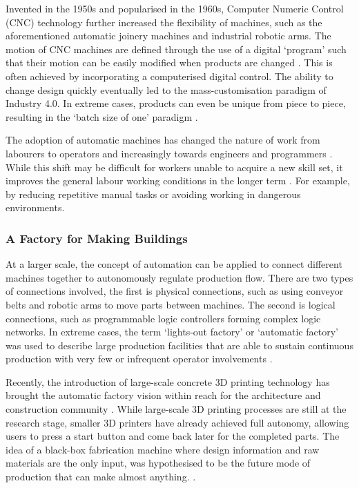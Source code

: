 Invented in the 1950s and popularised in the 1960s, Computer Numeric Control (CNC) technology further increased the flexibility of machines, such as the aforementioned automatic joinery machines and industrial robotic arms. The motion of CNC machines are defined through the use of a digital ‘program’ such that their motion can be easily modified when products are changed \parencite{wardAutomaticProgrammingNumerically1959}. This is often achieved by incorporating a computerised digital control. The ability to change design quickly eventually led to the mass-customisation paradigm of Industry 4.0. In extreme cases, products can even be unique from piece to piece, resulting in the ‘batch size of one’ paradigm \parencite{wardAutomaticProgrammingNumerically1959}.

The adoption of automatic machines has changed the nature of work from labourers to operators and increasingly towards engineers and programmers \parencite{nobleForcesProductionSocial1986}. While this shift may be difficult for workers unable to acquire a new skill set, it improves the general labour working conditions in the longer term \parencite{stromquistWorldDevelopmentReport2019}. For example, by reducing repetitive manual tasks or avoiding working in dangerous environments. 

\subsubsection{A Factory for Making Buildings}
\label{subsubsection:introduction_a_factory_for_making_buildings}

At a larger scale, the concept of automation can be applied to connect different machines together to autonomously regulate production flow. There are two types of connections involved, the first is physical connections, such as using conveyor belts and robotic arms to move parts between machines. The second is logical connections, such as programmable logic controllers forming complex logic networks. In extreme cases, the term ‘lights-out factory’ or ‘automatic factory’ was used to describe large production facilities that are able to sustain continuous production with very few or infrequent operator involvements \parencite{nobleForcesProductionSocial1986,walkerAutomaticFactoryCase1957}. 

Recently, the introduction of large-scale concrete 3D printing technology has brought the automatic factory vision within reach for the architecture and construction community \parencite{ngoAdditiveManufacturing3D2018}. While large-scale 3D printing processes are still at the research stage, smaller 3D printers have already achieved full autonomy, allowing users to press a start button and come back later for the completed parts. The idea of a black-box fabrication machine where design information and raw materials are the only input, was hypothesised to be the future mode of production that can make almost anything.\parencite{gershenfeldHowMakeAlmost2012, gershenfeldInternetThings2004} .  

